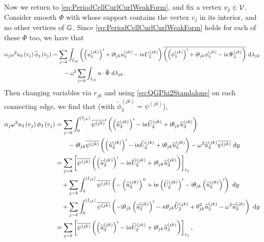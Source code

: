 Now we return to \eqref{eq:PeriodCellCurlCurlWeakForm}, and fix a vertex $v_j\in\mathcal{V}$.
Consider smooth $\Phi$ with whose support contains the vertex $v_j$ in its interior, and no other vertices of $\mathbb{G}$.
Since \eqref{eq:PeriodCellCurlCurlWeakForm} holds for each of these $\Phi$ too, we have that
\begin{align*}
	\alpha_j \omega^2 u_3\left( v_j \right) \overline{\phi}_3\left( v_j \right) 
	&= \sum_{j\sim k} \int_{I_{jk}} \left(  \left( u_3^{(jk)} \right)' + \mathrm{i}\theta_{jk} u_3^{(jk)} - \mathrm{i}\kappa U_2^{(jk)}  \right) \overline{ \left(  \left( \phi_3^{(jk)} \right)' + \mathrm{i}\theta_{jk} \phi_3^{(jk)} - \mathrm{i}\kappa \Psi_2^{(jk)} \right) } \ \mathrm{d}\lambda_{jk} \\
	&\qquad - \omega^2 \sum_{j\sim k}\int_{I_{jk}} u\cdot\overline{\Phi}  \ \mathrm{d}\lambda_{jk}.
\end{align*}
Then changing variables via $r_{jk}$ and using \eqref{eq:QGPhi2Standalone} on each connecting edge, we find that (with $\widetilde{\phi}_3^{(jk)} = \psi^{(jk)}$),
\begin{align*}
	\alpha_j \omega^2 u_3\bracs{v_j} \phi_3\bracs{v_j}
	 &= \sum_{j\con k} \int_0^{\abs{I_{jk}}} 	\overline{\psi^{(jk)}}' \bracs{ \bracs{\widetilde{u}_3^{(jk)}}' - \rmi\wavenumber\widetilde{U}_2^{(jk)} + \rmi\qm_{jk}\widetilde{u}_3^{(jk)} } \\
		&\qquad -\rmi\qm_{jk}\overline{\psi^{(jk)}}\bracs{ \bracs{\widetilde{u}_3^{(jk)}}' - \rmi\wavenumber\widetilde{U}_2^{(jk)} + \rmi\qm_{jk}\widetilde{u}_3^{(jk)} }
		- \omega^2 \widetilde{u}_3^{(jk)}\overline{\psi^{(jk)}} \ \md y \\
	&= \sum_{j\con k}\sqbracs{ \overline{\psi^{(jk)}}\bracs{ \bracs{\widetilde{u}_3^{(jk)}}' - \rmi\wavenumber\widetilde{U}_2^{(jk)} + \rmi\qm_{jk}\widetilde{u}_3^{(jk)} } }_{v_j} \\
	&\quad + \sum_{j\con k}\int_0^{\abs{I_{jk}}} \overline{\psi^{(jk)}} \bracs{ -\bracs{\widetilde{u}_3^{(jk)}}'' + \rmi\wavenumber\bracs{\widetilde{U}_2^{(jk)}}' - \rmi\qm_{jk}\bracs{\widetilde{u}_3^{(jk)}}' } \ \md y \\
	&\quad + \sum_{j\con k}\int_0^{\abs{I_{jk}}} \overline{\psi^{(jk)}} \bracs{ - \rmi\qm_{jk}\bracs{\widetilde{u}_3^{(jk)}}' - \wavenumber\qm_{jk}\widetilde{U}_2^{(jk)} + \qm_{jk}^2\widetilde{u}_3^{(jk)} - \omega^2\widetilde{u}_3^{(jk)} } \ \md y \\
	&= \sum_{j\con k}\sqbracs{ \overline{\psi^{(jk)}}\bracs{ \bracs{\widetilde{u}_3^{(jk)}}' - \rmi\wavenumber\widetilde{U}_2^{(jk)} + \rmi\qm_{jk}\widetilde{u}_3^{(jk)} } }_{v_j},
\end{align*}
